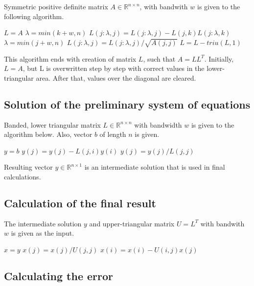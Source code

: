 \documentclass{article}
\begin{document}
Symmetric positive definite matrix $A \in \mathbb{R}^{n \times n}$, with bandwith $w$ is
given to the following algorithm.

\begin{algorithmic}
\STATE $L=A$
		\STATE $\lambda = min(k+w,n)$
		\STATE $L(j:\lambda,j) = L(j:\lambda,j) - L(j,k) L(j:\lambda,k)$
	\ENDFOR
	\STATE $\lambda = min(j+w,n)$
	\STATE $L(j:\lambda,j) = L(j:\lambda,j) / \sqrt{A(j,j)}$
\ENDFOR
\STATE $L = L - triu(L, 1)$
\end{algorithmic}

This algorithm ends with creation of matrix $L$, such that $A = LL^T$.
Initially, $L = A$, but L is overwritten step by step with correct values in the
lower-triangular area. After that, values over the diagonal are cleared.

\subsection{Solution of the preliminary system of equations}

Banded, lower triangular matrix $L \in \mathbb{R}^{n \times n}$ with bandwidth $w$ is
given to the algorithm below. Also, vector $b$ of length $n$ is given. 

\begin{algorithmic}
\STATE $y = b$
		\STATE $y(j) = y(j) - L(j,i) y(i)$
	\ENDFOR
	\STATE $y(j) = y(j)/L(j,j)$
\ENDFOR
\end{algorithmic}

Resulting vector $y \in \mathbb{R}^{n \times 1}$ is an intermediate solution
that is used in final calculations.

\subsection{Calculation of the final result}

The intermediate solution $y$ and upper-triangular matrix $U = L^T$ with
bandwith $w$ is given as the input.

\begin{algorithmic}
\STATE $x=y$
	\STATE $x(j) = x(j)/U(j,j)$
		\STATE $x(i) = x(i) - U(i,j) x(j)$
	\ENDFOR
\ENDFOR
\end{algorithmic}

\subsection{Calculating the error}
\end{document}
